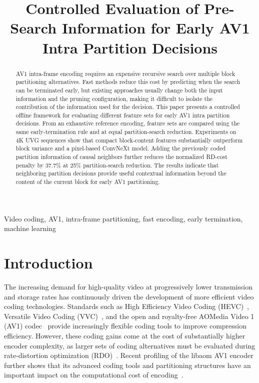 \documentclass{article}
\title{Controlled Evaluation of Pre-Search Information for Early AV1 Intra Partition Decisions}
\begin{document}
\ninept

\maketitle

\begin{abstract}
AV1 intra-frame encoding requires an expensive recursive search over multiple block partitioning alternatives. Fast methods reduce this cost by predicting when the search can be terminated early, but existing approaches usually change both the input information and the pruning configuration, making it difficult to isolate the contribution of the information used for the decision. This paper presents a controlled offline framework for evaluating different feature sets for early AV1 intra partition decisions. From an exhaustive reference encoding, feature sets are compared using the same early-termination rule and at equal partition-search reduction. Experiments on 4K UVG sequences show that compact block-content features substantially outperform block variance and a pixel-based ConvNeXt model. Adding the previously coded partition information of causal neighbors further reduces the normalized RD-cost penalty by 37.7\% at 25\% partition-search reduction. The results indicate that neighboring partition decisions provide useful contextual information beyond the content of the current block for early AV1 partitioning.
\end{abstract}

\begin{keywords}
Video coding, AV1, intra-frame partitioning, fast encoding, early termination,
machine learning
\end{keywords}

\section{Introduction}
\label{sec:intro}

The increasing demand for high-quality video at progressively lower transmission and storage rates has continuously driven the development of more efficient video coding technologies. Standards such as High Efficiency Video Coding (HEVC)~\cite{itut2013hevc}, Versatile Video Coding (VVC)~\cite{itut2020vvc}, and the open and royalty-free AOMedia Video 1 (AV1) codec~\cite{aomedia2019av1,han2021av1overview} provide increasingly flexible coding tools to improve compression efficiency. However, these coding gains come at the cost of substantially higher encoder complexity, as larger sets of coding alternatives must be evaluated during rate-distortion optimization (RDO)~\cite{sullivan1998rdoptimization,grois2016codingefficiency,layek2017encoderperformance}. Recent profiling of the libaom AV1 encoder further shows that its advanced coding tools and partitioning structures have an important impact on the computational cost of encoding~\cite{bender2023av1complexity}.
\end{document}
